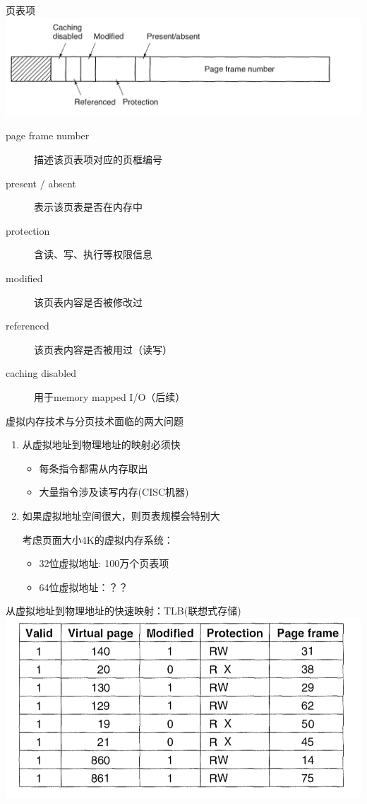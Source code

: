 \documentclass[xcolor=svgnames]{beamer}
\begin{document}
\begin{CJK*}{UTF8}{gbsn}
\begin{frame}{页表项}
\includegraphics[width=1.0\textwidth]{pte.png}
\begin{description}
\item[page frame number]描述该页表项对应的页框编号
\item[present / absent]表示该页表是否在内存中
\item[protection]含读、写、执行等权限信息
\item[modified]该页表内容是否被修改过
\item[referenced]该页表内容是否被用过（读写）
\item[caching disabled]用于memory mapped I/O（后续）
\end{description}
\end{frame}

\begin{frame}{虚拟内存技术与分页技术面临的两大问题}
\begin{enumerate}
\item 从虚拟地址到物理地址的映射必须快
\begin{itemize}
\item 每条指令都需从内存取出
\item 大量指令涉及读写内存(CISC机器)
\end{itemize}
\item 如果虚拟地址空间很大，则页表规模会特别大

考虑页面大小4K的虚拟内存系统：
\begin{itemize}
\item 32位虚拟地址: 100万个页表项
\item 64位虚拟地址：？？
\end{itemize}
\end{enumerate}
\end{frame}

\begin{frame}{从虚拟地址到物理地址的快速映射：TLB(联想式存储)}
\includegraphics[width=1.0\textwidth]{tlb.png}


\end{frame}
\end{CJK*}
\end{document}

